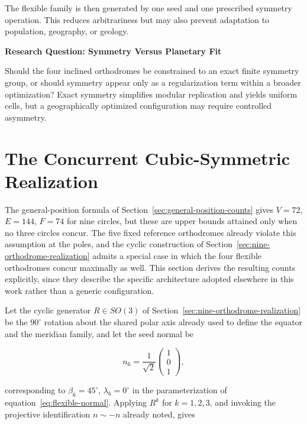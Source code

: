 \documentclass[11pt,fleqn]{book}
\numberwithin{equation}{chapter}
\newenvironment{research}[1]
  {\begin{researchEnv}
   \noindent\textbf{Research Question: #1}\par\smallskip}
  {\end{researchEnv}}
\theoremstyle{plain}
\theoremstyle{definition}
\theoremstyle{remark}
\begin{document}
The flexible family is then generated by one seed and one prescribed symmetry operation. This reduces arbitrariness but may also prevent adaptation to population, geography, or geology.

\begin{research}{Symmetry Versus Planetary Fit}
Should the four inclined orthodromes be constrained to an exact finite symmetry group, or should symmetry appear only as a regularization term within a broader optimization? Exact symmetry simplifies modular replication and yields uniform cells, but a geographically optimized configuration may require controlled asymmetry.
\end{research}

\section{The Concurrent Cubic-Symmetric Realization}
\label{sec:concurrent-cubic-realization}

The general-position formula of Section~\ref{sec:general-position-counts} gives \(V=72\), \(E=144\), \(F=74\) for nine circles, but these are upper bounds attained only when no three circles concur. The five fixed reference orthodromes already violate this assumption at the poles, and the cyclic construction of Section~\ref{sec:nine-orthodrome-realization} admits a special case in which the four flexible orthodromes concur maximally as well. This section derives the resulting counts explicitly, since they describe the specific architecture adopted elsewhere in this work rather than a generic configuration.

Let the cyclic generator \(R\in SO(3)\) of Section~\ref{sec:nine-orthodrome-realization} be the \(90^\circ\) rotation about the shared polar axis already used to define the equator and the meridian family, and let the seed normal be

\begin{equation}
    n_6
    =
    \frac{1}{\sqrt{2}}
    \begin{pmatrix}
      1\\0\\1
    \end{pmatrix},
\end{equation}

corresponding to \(\beta_6=45^\circ\), \(\lambda_6=0^\circ\) in the parameterization of equation~\eqref{eq:flexible-normal}. Applying \(R^k\) for \(k=1,2,3\), and invoking the projective identification \(n\sim -n\) already noted, gives
\end{document}
